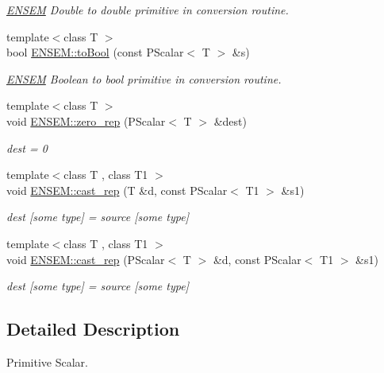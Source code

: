 \begin{DoxyCompactItemize}
\begin{DoxyCompactList}\small\item\em \mbox{\hyperlink{namespaceENSEM}{E\+N\+S\+EM}} Double to double primitive in conversion routine. \end{DoxyCompactList}\item 
{\footnotesize template$<$class T $>$ }\\bool \mbox{\hyperlink{group__primscalar_ga00261c3d6b58172e9dbb59a8d8518b4d}{E\+N\+S\+E\+M\+::to\+Bool}} (const P\+Scalar$<$ T $>$ \&s)
\begin{DoxyCompactList}\small\item\em \mbox{\hyperlink{namespaceENSEM}{E\+N\+S\+EM}} Boolean to bool primitive in conversion routine. \end{DoxyCompactList}\item 
{\footnotesize template$<$class T $>$ }\\void \mbox{\hyperlink{group__primscalar_gaf5afd39d3948d69df06ad306b2fdb494}{E\+N\+S\+E\+M\+::zero\+\_\+rep}} (P\+Scalar$<$ T $>$ \&dest)
\begin{DoxyCompactList}\small\item\em dest = 0 \end{DoxyCompactList}\item 
{\footnotesize template$<$class T , class T1 $>$ }\\void \mbox{\hyperlink{group__primscalar_ga32486e123809d21bcf028ab891ee845a}{E\+N\+S\+E\+M\+::cast\+\_\+rep}} (T \&d, const P\+Scalar$<$ T1 $>$ \&s1)
\begin{DoxyCompactList}\small\item\em dest \mbox{[}some type\mbox{]} = source \mbox{[}some type\mbox{]} \end{DoxyCompactList}\item 
{\footnotesize template$<$class T , class T1 $>$ }\\void \mbox{\hyperlink{group__primscalar_ga1444be24a3863d0af7a71b450500cb9d}{E\+N\+S\+E\+M\+::cast\+\_\+rep}} (P\+Scalar$<$ T $>$ \&d, const P\+Scalar$<$ T1 $>$ \&s1)
\begin{DoxyCompactList}\small\item\em dest \mbox{[}some type\mbox{]} = source \mbox{[}some type\mbox{]} \end{DoxyCompactList}\end{DoxyCompactItemize}


\subsection{Detailed Description}
Primitive Scalar. 

